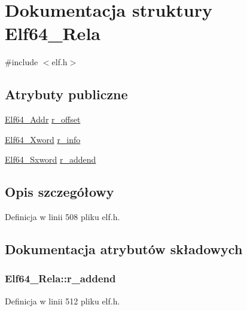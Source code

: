 \hypertarget{struct_elf64___rela}{\section{Dokumentacja struktury Elf64\-\_\-\-Rela}
\label{struct_elf64___rela}
}


{\ttfamily \#include $<$elf.\-h$>$}

\subsection*{Atrybuty publiczne}
\begin{DoxyCompactItemize}
\item 
\hyperlink{elf_8h_aeed51d08e3a950d637f8ec1f0cd4ef65}{Elf64\-\_\-\-Addr} \hyperlink{struct_elf64___rela_a9ea7e07ec6e0d57bf4bcd53b89de7948}{r\-\_\-offset}
\item 
\hyperlink{elf_8h_a5447a48a3dae0bd24f606415268c6fe4}{Elf64\-\_\-\-Xword} \hyperlink{struct_elf64___rela_aeab8bc0f9035184127ec02d947bf2c76}{r\-\_\-info}
\item 
\hyperlink{elf_8h_a5b450442210b3d21567662fb96ac9a02}{Elf64\-\_\-\-Sxword} \hyperlink{struct_elf64___rela_a04358b55027a7dcc414e221d916aac64}{r\-\_\-addend}
\end{DoxyCompactItemize}


\subsection{Opis szczegółowy}


Definicja w linii 508 pliku elf.\-h.



\subsection{Dokumentacja atrybutów składowych}
\hypertarget{struct_elf64___rela_a04358b55027a7dcc414e221d916aac64}{
\subsubsection[{r\-\_\-addend}]{ Elf64\-\_\-\-Rela\-::r\-\_\-addend}}\label{struct_elf64___rela_a04358b55027a7dcc414e221d916aac64}


Definicja w linii 512 pliku elf.\-h.

